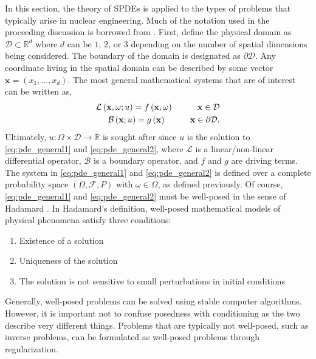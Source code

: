 In this section, the theory of \ac{SPDE}s is applied to the types of problems that typically arise in nuclear engineering. Much of the notation used in the proceeding discussion is borrowed from \cite{KarLoeXiu}. First, define the physical domain as $\mathcal{D} \subset \mathbb{R}^{d}$ where $d$ can be $1$, $2$, or $3$ depending on the number of spatial dimensions being considered. The boundary of the domain is designated as $\partial\mathcal{D}$. Any coordinate living in the spatial domain can be described by some vector $\textbf{x}=\left(x_1,...,x_d\right)$. The most general mathematical systems that are of interest can be written as,
\begin{eqnarray} 
\label{eq:pde_general1}
    \mathcal{L}\left(\textbf{x},\omega;u\right)=f\left(\textbf{x},\omega\right)
        \hspace{1 cm} \textbf{x} \in \mathcal{D}  \\
\label{eq:pde_general2}    \mathcal{B}\left(\textbf{x};u\right)=g\left(\textbf{x}\right) 
        \hspace{1 cm} \textbf{x} \in \partial\mathcal{D}.
\end{eqnarray}
Ultimately, $u:\Omega \times \mathcal{D}\rightarrow \mathbb{R}$ is sought after since $u$ is the solution to \ref{eq:pde_general1} and \ref{eq:pde_general2}, where $\mathcal{L}$ is a linear/non-linear differential operator, $\mathcal{B}$ is a boundary operator, and $f$ and $g$ are driving terms. The system in \ref{eq:pde_general1} and \ref{eq:pde_general2} is defined over a complete probability space $\left(\Omega,\mathcal{F},P\right)$ with $\omega \in \Omega$, as defined previously. Of course, \ref{eq:pde_general1} and \ref{eq:pde_general2} must be well-posed in the sense of Hadamard \cite{Hadamard}. In Hadamard's definition, well-posed mathematical models of physical phenomena satisfy three conditions:
\begin{enumerate}
    \item Existence of a solution
    \item Uniqueness of the solution
    \item The solution is not sensitive to small perturbations in initial conditions 
\end{enumerate} 
Generally, well-posed problems can be solved using stable computer algorithms. However, it is important not to confuse posedness with conditioning as the two describe very different things. Problems that are typically not well-posed, such as inverse problems, can be formulated as well-posed problems through regularization.     

